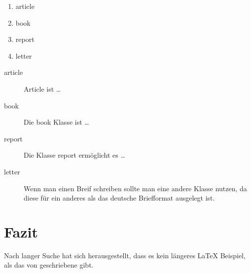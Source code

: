 \documentclass{article}
\begin{document}
\begin{enumerate}
\item article
\item book 
\item report 
\item letter 
\end{enumerate}

\begin{description}
\item[article\label{article}]{Article ist \ldots}
\item[book\label{book}]{Die book Klasse ist \ldots}
\item[report\label{report}]{Die Klasse report erm\"oglicht es  \ldots}
\item[letter\label{letter}]{Wenn man einen Breif schreiben sollte man eine 
	andere Klasse nutzen, da diese f\"ur ein anderes als das deutsche 
	Briefformat ausgelegt ist.}
\end{description}


\section{Fazit}\label{conclusions}
Nach langer Suche hat sich herausgestellt, dass es kein l\"angeres 
\LaTeX{} Beispiel, als das von \cite{doe} geschriebene gibt. 
\end{document}
